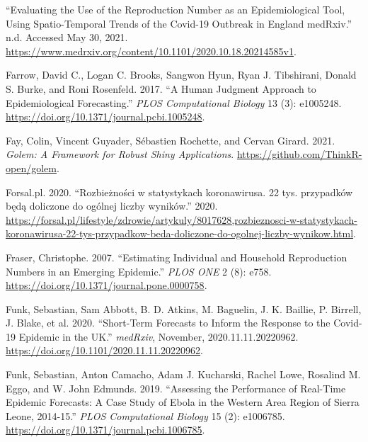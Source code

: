 \documentclass[
]{article}
\newlength{\cslhangindent}
\newlength{\cslentryspacingunit} %
\newenvironment{CSLReferences}[2] %
 {%
  \setlength{\parindent}{0pt}
  \ifodd #1
  \let\oldpar\par
  \def\par{\hangindent=\cslhangindent\oldpar}
  \fi
  \setlength{\parskip}{#2\cslentryspacingunit}
 }%
 {}
\begin{document}
\begin{CSLReferences}{1}{0}
\leavevmode{}%
{``Evaluating the Use of the Reproduction Number as an Epidemiological Tool, Using Spatio-Temporal Trends of the {Covid}-19 Outbreak in {England} \textbar{} {medRxiv}.''} n.d. Accessed May 30, 2021. \url{https://www.medrxiv.org/content/10.1101/2020.10.18.20214585v1}.

\leavevmode{}%
Farrow, David C., Logan C. Brooks, Sangwon Hyun, Ryan J. Tibshirani, Donald S. Burke, and Roni Rosenfeld. 2017. {``A Human Judgment Approach to Epidemiological Forecasting.''} \emph{PLOS Computational Biology} 13 (3): e1005248. \url{https://doi.org/10.1371/journal.pcbi.1005248}.

\leavevmode{}%
Fay, Colin, Vincent Guyader, Sébastien Rochette, and Cervan Girard. 2021. \emph{Golem: A Framework for Robust Shiny Applications}. \url{https://github.com/ThinkR-open/golem}.

\leavevmode{}%
Forsal.pl. 2020. {``Rozbieżności w statystykach koronawirusa. 22 tys. przypadków będą doliczone do ogólnej liczby wyników.''} 2020. \url{https://forsal.pl/lifestyle/zdrowie/artykuly/8017628,rozbieznosci-w-statystykach-koronawirusa-22-tys-przypadkow-beda-doliczone-do-ogolnej-liczby-wynikow.html}.

\leavevmode{}%
Fraser, Christophe. 2007. {``Estimating {Individual} and {Household Reproduction Numbers} in an {Emerging Epidemic}.''} \emph{PLOS ONE} 2 (8): e758. \url{https://doi.org/10.1371/journal.pone.0000758}.

\leavevmode{}%
Funk, Sebastian, Sam Abbott, B. D. Atkins, M. Baguelin, J. K. Baillie, P. Birrell, J. Blake, et al. 2020. {``Short-Term Forecasts to Inform the Response to the {Covid}-19 Epidemic in the {UK}.''} \emph{medRxiv}, November, 2020.11.11.20220962. \url{https://doi.org/10.1101/2020.11.11.20220962}.

\leavevmode{}%
Funk, Sebastian, Anton Camacho, Adam J. Kucharski, Rachel Lowe, Rosalind M. Eggo, and W. John Edmunds. 2019. {``Assessing the Performance of Real-Time Epidemic Forecasts: A Case Study of {Ebola} in the {Western Area} Region of {Sierra Leone}, 2014-15.''} \emph{PLOS Computational Biology} 15 (2): e1006785. \url{https://doi.org/10.1371/journal.pcbi.1006785}.


\end{CSLReferences}
\end{document}
